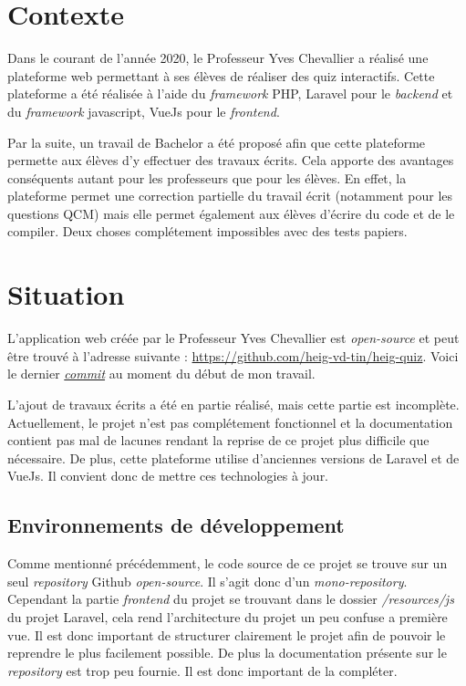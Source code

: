 
\section{Contexte}
Dans le courant de l'année 2020, le Professeur Yves Chevallier a réalisé une plateforme web permettant à ses élèves de réaliser des quiz interactifs. Cette plateforme a été réalisée à l'aide du \emph{framework} PHP, Laravel \cite{Laravel} pour le \emph{backend} et du \emph{framework} javascript, VueJs \cite{Vuejs} pour le \emph{frontend}.

Par la suite, un travail de Bachelor a été proposé afin que cette plateforme permette aux élèves d'y effectuer des travaux écrits. Cela apporte des avantages conséquents autant pour les professeurs que pour les élèves. En effet, la plateforme permet une correction partielle du travail écrit (notamment pour les questions QCM) mais elle permet également aux élèves d'écrire du code et de le compiler. Deux choses complétement impossibles avec des tests papiers.


\section{Situation}
L'application web créée par le Professeur Yves Chevallier est \emph{open-source} et peut être trouvé à l'adresse suivante : \url{https://github.com/heig-vd-tin/heig-quiz}. Voici le dernier \href{https://github.com/heig-vd-tin/heig-quiz/commit/28fb1ac5367931f6aa986041fb992c651c9816cd}{\emph{commit}} au moment du début de mon travail.

L'ajout de travaux écrits a été en partie réalisé, mais cette partie est incomplète. Actuellement, le projet n'est pas complétement fonctionnel et la documentation contient pas mal de lacunes rendant la reprise de ce projet plus difficile que nécessaire. De plus, cette plateforme utilise d'anciennes versions de Laravel et de VueJs. Il convient donc de mettre ces technologies à jour.

\subsection{Environnements de développement}
Comme mentionné précédemment, le code source de ce projet se trouve sur un seul \emph{repository} Github \emph{open-source}. Il s'agit donc d'un \emph{mono-repository}. Cependant la partie \emph{frontend} du projet se trouvant dans le dossier \emph{/resources/js} du projet Laravel, cela rend l'architecture du projet un peu confuse a première vue. Il est donc important de structurer clairement le projet afin de pouvoir le reprendre le plus facilement possible. De plus la documentation présente sur le \emph{repository} est trop peu fournie. Il est donc important de la compléter.


